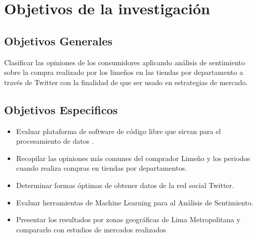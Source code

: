 
\chapter{Objetivos de la investigaci\'on}
\label{intro}


\section{Objetivos Generales}
Clasificar las opiniones de los consumidores aplicando análisis de sentimiento sobre la compra realizado por los limeños en las tiendas por departamento a través de Twitter con la finalidad de que ser usado en estrategias de mercado.

\section{Objetivos Especificos}
\begin{itemize}
\item Evaluar plataforma de software de código libre que sirvan para el procesamiento de datos .
\item Recopilar las opiniones m\'as comunes del comprador Limeño y los periodos cuando realiza compras en tiendas por departamentos.
\item Determinar formas \'optimas de obtener datos de la red social Twitter.
\item Evaluar herramientas de Machine Learning para al Análisis de Sentimiento.
\item Presentar los resultados por zonas geogr\'aficas de Lima Metropolitana y compararlo con estudios de mercados realizados
\end{itemize}

\cleardoublepage